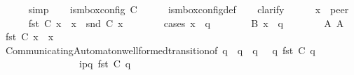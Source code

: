 \begin{isabellebody}
\ \ \ \ \isamarkupfalse%
\ simp\isanewline
\ \ \isamarkupfalse%
\ {\isachardoublequoteopen}is{\isacharunderscore}{\kern0pt}mbox{\isacharunderscore}{\kern0pt}config\ C{}{\isachardoublequoteclose}\isanewline
\ \ \ \ \isamarkupfalse%
\ is{\isacharunderscore}{\kern0pt}mbox{\isacharunderscore}{\kern0pt}config{\isacharunderscore}{\kern0pt}def\isanewline
\ \ \isamarkupfalse%
\ clarify\isanewline
\ \ \ \ \isamarkupfalse%
\ x\ {\isacharcolon}{\kern0pt}{\isacharcolon}{\kern0pt}\ {\isachardoublequoteopen}{\isacharprime}{\kern0pt}peer{\isachardoublequoteclose}\isanewline
\ \ \ \ \isamarkupfalse%
\ {\isachardoublequoteopen}fst\ {\isacharparenleft}{\kern0pt}C{}\ x{\isacharparenright}{\kern0pt}\ {\isasymin}\ {\isasymS}{\isacharparenleft}{\kern0pt}x{\isacharparenright}{\kern0pt}\ {\isasymand}\ snd\ {\isacharparenleft}{\kern0pt}C{}\ x{\isacharparenright}{\kern0pt}\ {\isasymin}\ {\isasymM}\isactrlsup {\isacharasterisk}{\kern0pt}{\isachardoublequoteclose}\isanewline
\ \ \ \ \isamarkupfalse%
\ {\isacharparenleft}{\kern0pt}cases\ {\isachardoublequoteopen}x\ {\isacharequal}{\kern0pt}\ q{\isachardoublequoteclose}{\isacharparenright}{\kern0pt}\isanewline
\ \ \ \ \ \ \isamarkupfalse%
\ B{\isacharcolon}{\kern0pt}\ {\isachardoublequoteopen}x\ {\isacharequal}{\kern0pt}\ q{\isachardoublequoteclose}\isanewline
\ \ \ \ \ \ \isamarkupfalse%
\ A{}\ A{}\ \isamarkupfalse%
\ {\isachardoublequoteopen}fst\ {\isacharparenleft}{\kern0pt}C{}\ x{\isacharparenright}{\kern0pt}\ {\isasymin}\ {\isasymS}{\isacharparenleft}{\kern0pt}x{\isacharparenright}{\kern0pt}{\isachardoublequoteclose}\isanewline
\ \ \ \ \ \ \ \ \isamarkupfalse%
\ CommunicatingAutomaton{\isachardot}{\kern0pt}well{\isacharunderscore}{\kern0pt}formed{\isacharunderscore}{\kern0pt}transition{\isacharbrackleft}{\kern0pt}of\ q\ {\isachardoublequoteopen}{\isasymS}\ q{\isachardoublequoteclose}\ {\isachardoublequoteopen}{\isasymI}\ q{\isachardoublequoteclose}\ {\isasymM}\ {\isachardoublequoteopen}{\isasymR}\ q{\isachardoublequoteclose}\ {\isachardoublequoteopen}fst\ {\isacharparenleft}{\kern0pt}C{}\ q{\isacharparenright}{\kern0pt}{\isachardoublequoteclose}\isanewline
\ \ \ \ \ \ \ \ \ \ \ \ \ \ \ \ {\isachardoublequoteopen}{\isacharquery}{\kern0pt}{\isasymlangle}{\isacharparenleft}{\kern0pt}i\isactrlbsup p{\isasymrightarrow}q\isactrlesup {\isacharparenright}{\kern0pt}{\isasymrangle}{\isachardoublequoteclose}\ {\isachardoublequoteopen}fst\ {\isacharparenleft}{\kern0pt}C{}\ q{\isacharparenright}{\kern0pt}{\isachardoublequoteclose}{\isacharbrackright}{\kern0pt}\isanewline

\end{isabellebody}
